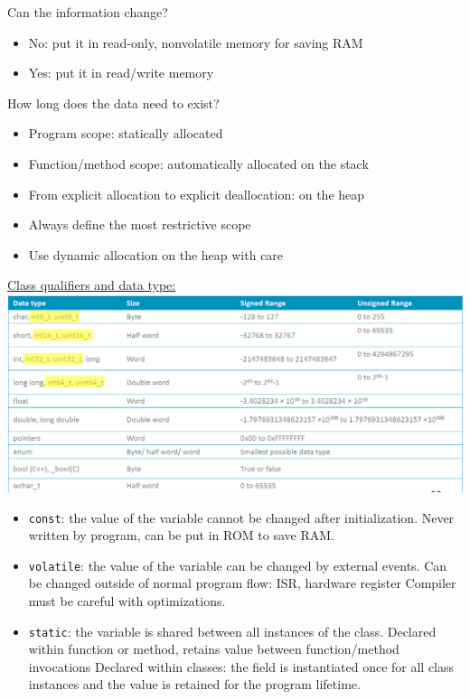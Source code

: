 Can the information change?
\begin{itemize}
    \item No: put it in read-only, nonvolatile memory for saving RAM
    \item Yes: put it in read/write memory
\end{itemize}
How long does the data need to exist?
\begin{itemize}
    \item Program scope: statically allocated
    \item Function/method scope: automatically allocated on the stack
    \item From explicit allocation to explicit deallocation: on the heap
    \item Always define the most restrictive scope
    \item Use dynamic allocation on the heap with care
\end{itemize}
\underline{Class qualifiers and data type:}\\
\includegraphics*[width=\columnwidth]{images/data_types.png}
\begin{itemize}
    \item \texttt{const}: the value of the variable cannot be changed after initialization.
          Never written by program, can be put in ROM to save RAM.
    \item \texttt{volatile}: the value of the variable can be changed by external events.
          Can be changed outside of normal program flow: ISR, hardware register
          Compiler must be careful with optimizations.
    \item \texttt{static}: the variable is shared between all instances of the class.
          Declared within function or method, retains value between function/method invocations
          Declared within classes: the field is instantiated once for all class instances and the value
          is retained for the program lifetime.
\end{itemize}
